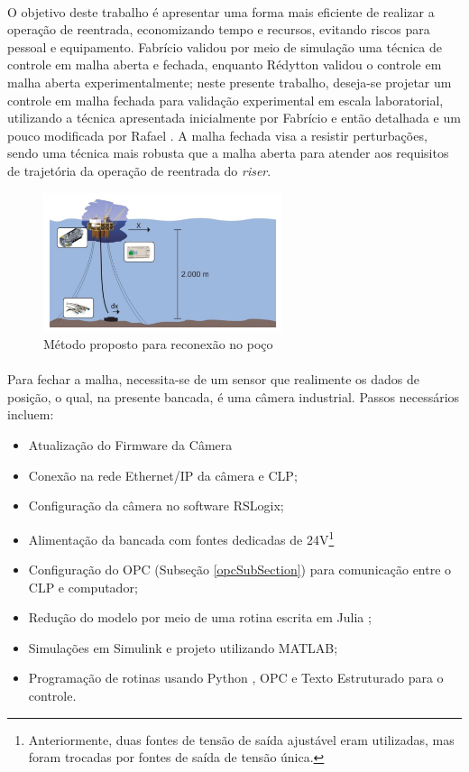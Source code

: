 \paragraph{} O objetivo deste trabalho é apresentar uma forma mais eficiente de realizar a operação de reentrada, economizando tempo e recursos, evitando riscos para pessoal e equipamento. Fabrício \cite{fabricioIFAC} validou por meio de simulação uma técnica de controle em malha aberta e fechada, enquanto Rédytton \cite{redytton} validou o controle em malha aberta experimentalmente; neste presente trabalho, deseja-se projetar um controle em malha fechada para validação experimental em escala laboratorial, utilizando a técnica apresentada inicialmente por Fabrício \cite{fabricioIFAC} e então detalhada e um pouco modificada por Rafael \cite{rafaelMestrado}. A malha fechada visa a resistir perturbações, sendo uma técnica mais robusta que a malha aberta para atender aos requisitos de trajetória da operação de reentrada do \textit{riser}.

\begin{figure}[ht!]
\centering
  \includegraphics[width=7cm]{figs/introducao/posicionamentoProposto}
  \caption{Método proposto para reconexão no poço \cite{redytton} \label{posicionamentoProposto}}
\end{figure}

\paragraph{} Para fechar a malha, necessita-se de um sensor que realimente os dados de posição, o qual, na presente bancada, é uma câmera industrial. Passos necessários incluem: \begin{itemize}
	\item Atualização do Firmware da Câmera
	\item Conexão na rede Ethernet/IP da câmera e CLP;
	\item Configuração da câmera no software RSLogix;
	\item Alimentação da bancada com fontes dedicadas de 24V\footnote{Anteriormente, duas fontes de tensão de saída ajustável eram utilizadas, mas foram trocadas por fontes de saída de tensão única.}
	\item Configuração do OPC (Subseção \ref{opcSubSection}) para comunicação entre o CLP e computador;
	\item Redução do modelo por meio de uma rotina escrita em Julia \cite{julia};
	\item Simulações em Simulink e projeto utilizando MATLAB;
	\item Programação de rotinas usando Python \cite{python}, OPC e Texto Estruturado para o controle.
\end{itemize}

